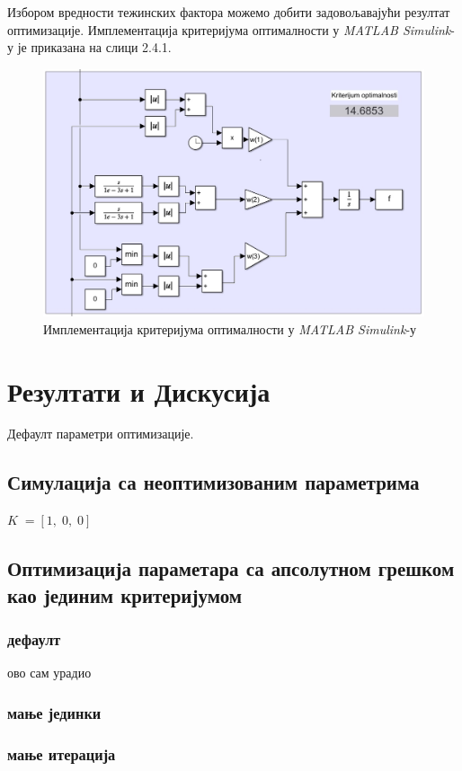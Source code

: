 \documentclass[12pt]{article}
\begin{document}
Избором вредности тежинских фактора можемо добити задовољавајући резултат оптимизације. Имплементација критеријума оптималности у \textit{MATLAB Simulink}-у је приказана на слици 2.4.1.
\begin{figure}[H]
    \centering
    \includegraphics[width=17.5cm]{figures/krit_opti.jpg}
    \caption{Имплементација критеријума оптималности у \textit{MATLAB Simulink}-у}
    \label{fig:kriterijum_optimalnosti}
\end{figure}

\newpage
\section{Резултати и Дискусија}
Дефаулт параметри оптимизације.
\subsection{Симулација са неоптимизованим параметрима}
$K\;=[1,\;0,\;0]$

\subsection{Оптимизација параметара са апсолутном грешком као јединим критеријумом}
\subsubsection{дефаулт}
ово сам урадио
\subsubsection{мање јединки}
\subsubsection{мање итерација}
\end{document}
